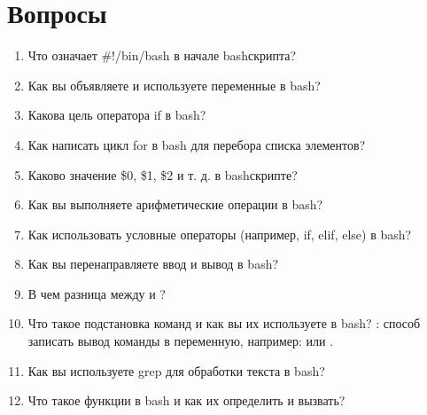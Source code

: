 \documentclass[letterpaper,10pt,russian]{sphinxmanual}
\begin{document}
\section{Вопросы}
\label{\detokenize{educational_materials/bash/quiz:id1}}\label{\detokenize{educational_materials/bash/quiz::doc}}\begin{enumerate}
%
\item {} 
\sphinxAtStartPar
Что означает \#!/bin/bash в начале bash\sphinxhyphen{}скрипта?

\item {} 
\sphinxAtStartPar
Как вы объявляете и используете переменные в bash?

\item {} 
\sphinxAtStartPar
Какова цель оператора if в bash?

\item {} 
\sphinxAtStartPar
Как написать цикл for в bash для перебора списка элементов?

\item {} 
\sphinxAtStartPar
Каково значение \$0, \$1, \$2 и т. д. в bash\sphinxhyphen{}скрипте?

\item {} 
\sphinxAtStartPar
Как вы выполняете арифметические операции в bash?

\item {} 
\sphinxAtStartPar
Как использовать условные операторы (например, if, elif, else) в bash?

\item {} 
\sphinxAtStartPar
Как вы перенаправляете ввод и вывод в bash?

\item {} 
\sphinxAtStartPar
В чем разница между \sphinxcode{\sphinxupquote{\textgreater{}}} и \sphinxcode{\sphinxupquote{\textgreater{}\textgreater{}}}?

\item {} 
\sphinxAtStartPar
Что такое подстановка команд и как вы их используете в bash? : способ записать вывод команды в переменную, например:  или .

\item {} 
\sphinxAtStartPar
Как вы используете grep для обработки текста в bash?

\item {} 
\sphinxAtStartPar
Что такое функции в bash и как их определить и вызвать?


\end{enumerate}
\end{document}
